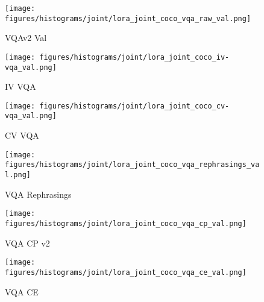 \begin{figure*}[!h]
    \centering

    \begin{subfigure}[b]{0.3\linewidth}
        \centering
        \texttt{[image: figures/histograms/joint/lora\_joint\_coco\_vqa\_raw\_val.png]}
        \caption{VQAv2 Val}
        \label{fig:vqaVQAv2_val}
    \end{subfigure}
    \hfill
    \begin{subfigure}[b]{0.3\linewidth}
        \centering
        \texttt{[image: figures/histograms/joint/lora\_joint\_coco\_iv-vqa\_val.png]}
        \caption{IV VQA}
        \label{fig:vqaivvqa}
    \end{subfigure}
    \hfill
    \begin{subfigure}[b]{0.3\linewidth}
        \centering
        \texttt{[image: figures/histograms/joint/lora\_joint\_coco\_cv-vqa\_val.png]}
        \caption{CV VQA}
        \label{fig:vqacvvqa}
    \end{subfigure}

    \vspace{0.5cm} %

    \begin{subfigure}[b]{0.3\linewidth}
        \centering
        \texttt{[image: figures/histograms/joint/lora\_joint\_coco\_vqa\_rephrasings\_val.png]}
        \caption{VQA Rephrasings}
        \label{fig:vqavqa_rephrasings}
    \end{subfigure}
    \hfill
    \begin{subfigure}[b]{0.3\linewidth}
        \centering
        \texttt{[image: figures/histograms/joint/lora\_joint\_coco\_vqa\_cp\_val.png]}
        \caption{VQA CP v2}
        \label{fig:vqavqa_cp_v2}
    \end{subfigure}
    \hfill
    \begin{subfigure}[b]{0.3\linewidth}
        \centering
        \texttt{[image: figures/histograms/joint/lora\_joint\_coco\_vqa\_ce\_val.png]}
        \caption{VQA CE}
        \label{fig:vqavqa_ce}
    \end{subfigure}

    \vspace{0.5cm} %


\end{figure*}
